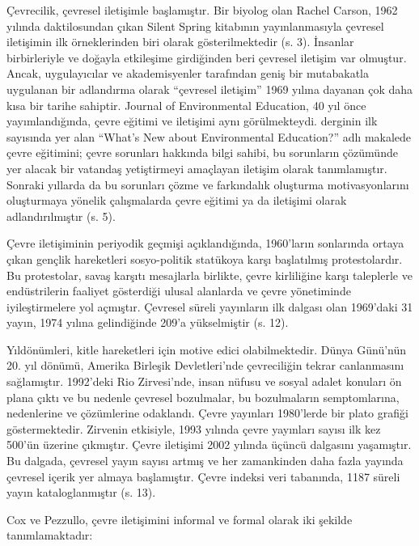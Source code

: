 \documentclass[
]{book}
\begin{document}
Çevrecilik, çevresel iletişimle başlamıştır. Bir biyolog olan Rachel Carson, 1962 yılında daktilosundan çıkan Silent Spring kitabının yayınlanmasıyla çevresel iletişimin ilk örneklerinden biri olarak gösterilmektedir (s. 3). \citep{flor2005environmental} İnsanlar birbirleriyle ve doğayla etkileşime girdiğinden beri çevresel iletişim var olmuştur. Ancak, uygulayıcılar ve akademisyenler tarafından geniş bir mutabakatla uygulanan bir adlandırma olarak ``çevresel iletişim'' 1969 yılına dayanan çok daha kısa bir tarihe sahiptir. Journal of Environmental Education, 40 yıl önce yayımlandığında, çevre eğitimi ve iletişimi aynı görülmekteydi. \citet{schoenfeld1969whats} derginin ilk sayısında yer alan ``What's New about Environmental Education?'' adlı makalede çevre eğitimini; çevre sorunları hakkında bilgi sahibi, bu sorunların çözümünde yer alacak bir vatandaş yetiştirmeyi amaçlayan iletişim olarak tanımlamıştır. Sonraki yıllarda da bu sorunları çözme ve farkındalık oluşturma motivasyonlarını oluşturmaya yönelik çalışmalarda çevre eğitimi ya da iletişimi olarak adlandırılmıştır (s. 5). \citep{jurin2010environmental}

Çevre iletişiminin periyodik geçmişi açıklandığında, 1960'ların sonlarında ortaya çıkan gençlik hareketleri sosyo-politik statükoya karşı başlatılmış protestolardır. Bu protestolar, savaş karşıtı mesajlarla birlikte, çevre kirliliğine karşı taleplerle ve endüstrilerin faaliyet gösterdiği ulusal alanlarda ve çevre yönetiminde iyileştirmelere yol açmıştır. Çevresel süreli yayınların ilk dalgası olan 1969'daki 31 yayın, 1974 yılına gelindiğinde 209'a yükselmiştir (s. 12). \citep{jurin2010environmental}

Yıldönümleri, kitle hareketleri için motive edici olabilmektedir. Dünya Günü'nün 20. yıl dönümü, Amerika Birleşik Devletleri'nde çevreciliğin tekrar canlanmasını sağlamıştır. 1992'deki Rio Zirvesi'nde, insan nüfusu ve sosyal adalet konuları ön plana çıktı ve bu nedenle çevresel bozulmalar, bu bozulmaların semptomlarına, nedenlerine ve çözümlerine odaklandı. Çevre yayınları 1980'lerde bir plato grafiği göstermektedir. Zirvenin etkisiyle, 1993 yılında çevre yayınları sayısı ilk kez 500'ün üzerine çıkmıştır. Çevre iletişimi 2002 yılında üçüncü dalgasını yaşamıştır. Bu dalgada, çevresel yayın sayısı artmış ve her zamankinden daha fazla yayında çevresel içerik yer almaya başlamıştır. Çevre indeksi veri tabanında, 1187 süreli yayın kataloglanmıştır (s. 13). \citep{jurin2010environmental}

Cox ve Pezzullo, çevre iletişimini informal ve formal olarak iki şekilde tanımlamaktadır: \citep{cox2018}
\end{document}
